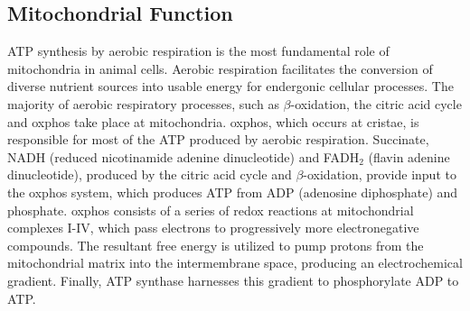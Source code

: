 \documentclass[12pt,twoside]{reedthesis}
\begin{document}
\subsection{Mitochondrial Function}

ATP synthesis by aerobic respiration is the most fundamental role of mitochondria in animal cells.
Aerobic respiration facilitates the conversion of diverse nutrient sources into usable energy for endergonic cellular processes.
The majority of aerobic respiratory processes, such as $\beta$-oxidation, the citric acid cycle and \gls{oxphos} take place at mitochondria.
\gls{oxphos}, which occurs at cristae, is responsible for most of the ATP produced by aerobic respiration.
Succinate, NADH (reduced nicotinamide adenine dinucleotide) and FADH$_2$ (flavin adenine dinucleotide), produced by the citric acid cycle and $\beta$-oxidation, provide input to the \gls{oxphos} system, which produces ATP from ADP (adenosine diphosphate) and phosphate.
\gls{oxphos} consists of a series of redox reactions at mitochondrial complexes I-IV, which pass electrons to progressively more electronegative compounds. 
The resultant free energy is utilized to pump protons from the mitochondrial matrix into the intermembrane space, producing an electrochemical gradient.
Finally, ATP synthase harnesses this gradient to phosphorylate ADP to ATP.
\end{document}
